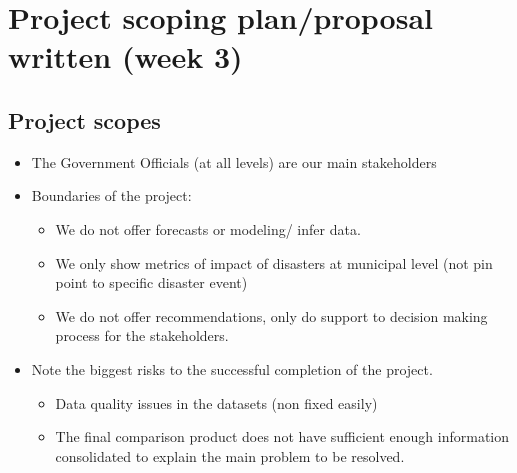 \documentclass[11pt]{article}
\begin{document}






\section{Project scoping plan/proposal written (week 3)}
\label{sec:app}

\subsection{Project scopes}

\begin{itemize}
\item The Government Officials (at all levels) are our main stakeholders
\item Boundaries of the project:
\begin{itemize}
\item We do not offer forecasts or modeling/ infer data.
\item We only show metrics of impact of disasters at municipal level (not pin point to specific disaster event)
\item We do not offer recommendations, only do support to decision making process for the stakeholders.
\end{itemize}
\item Note the biggest risks to the successful completion of the project.
\begin{itemize}
\item Data quality issues in the datasets (non fixed easily)
\item The final comparison product does not have sufficient enough information consolidated to explain the main problem to be resolved.
\end{itemize}
\end{itemize}
\end{document}
